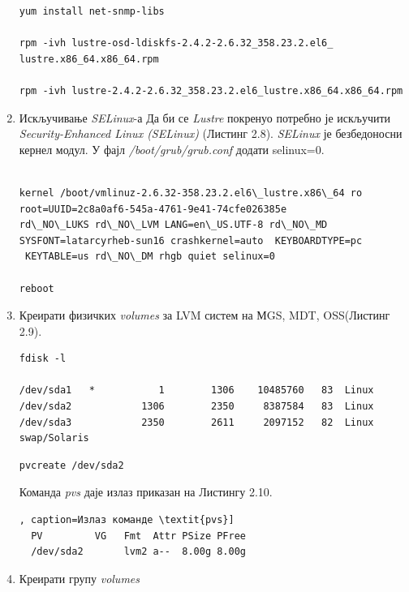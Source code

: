 \begin{enumerate}
\begin{lstlisting}[style=nonumbers,frame=single,caption= Инсталација Net-SNMP-а]
yum install net-snmp-libs

rpm -ivh lustre-osd-ldiskfs-2.4.2-2.6.32_358.23.2.el6_
lustre.x86_64.x86_64.rpm

rpm -ivh lustre-2.4.2-2.6.32_358.23.2.el6_lustre.x86_64.x86_64.rpm
\end{lstlisting}


\item Искључивање \textit{SELinux}-а 
Да би се   \textit{Lustre} покренуо потребно је искључити \textit{Security-Enhanced Linux (SELinux)} (Листинг 2.8). \textit{SELinux} је безбедоносни кернел модул.
У фајл \textit{/boot/grub/grub.conf} додати selinux=0.

\begin{lstlisting}[style=nonumbers,frame=single,caption= Команде за искључивање \textit{SELinux}-а]

kernel /boot/vmlinuz-2.6.32-358.23.2.el6\_lustre.x86\_64 ro root=UUID=2c8a0af6-545a-4761-9e41-74cfe026385e 
rd\_NO\_LUKS rd\_NO\_LVM LANG=en\_US.UTF-8 rd\_NO\_MD SYSFONT=latarcyrheb-sun16 crashkernel=auto  KEYBOARDTYPE=pc
 KEYTABLE=us rd\_NO\_DM rhgb quiet selinux=0

reboot 
\end{lstlisting}

\item Креирати физичких \textit{volumes} за LVM систем на МGS, MDT, OSS(Листинг 2.9).
\begin{lstlisting}[style=nonumbers,frame=single, caption=Излаз команде \textit{fdisk -l}]
fdisk -l

/dev/sda1   *           1        1306    10485760   83  Linux
/dev/sda2            1306        2350     8387584   83  Linux
/dev/sda3            2350        2611     2097152   82  Linux swap/Solaris
\end{lstlisting}

\begin{verbatim}
pvcreate /dev/sda2
\end{verbatim}

Команда \textit{pvs} даје излаз приказан на Листингу 2.10.

\begin{lstlisting}[style=nonumbers,frame=single], caption=Излаз команде \textit{pvs}]
  PV         VG   Fmt  Attr PSize PFree
  /dev/sda2       lvm2 a--  8.00g 8.00g
\end{lstlisting}

\item Креирати групу \textit{volumes}


\end{enumerate}
